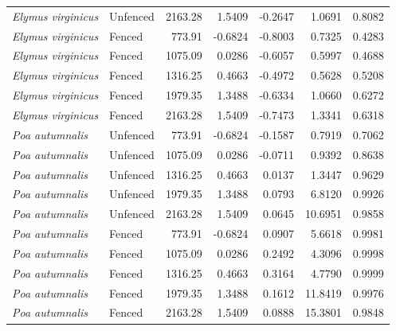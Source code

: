 \documentclass[12pt]{article}\usepackage[]{graphicx}\usepackage[dvipsnames]{xcolor}
\begin{document}
\begin{landscape}
\begin{table}[ht]
\begin{tabular}{llrrrrr}
\textit{Elymus virginicus} & Unfenced & 2163.28 & 1.5409   & -0.2647 & 1.0691 & 0.8082 \\
\textit{Elymus virginicus} & Fenced   & 773.91  & -0.6824  & -0.8003 & 0.7325 & 0.4283 \\
\textit{Elymus virginicus} & Fenced   & 1075.09 & 0.0286   & -0.6057 & 0.5997 & 0.4688 \\
\textit{Elymus virginicus} & Fenced   & 1316.25 & 0.4663   & -0.4972 & 0.5628 & 0.5208 \\
\textit{Elymus virginicus} & Fenced   & 1979.35 & 1.3488   & -0.6334 & 1.0660 & 0.6272 \\
\textit{Elymus virginicus} & Fenced   & 2163.28 & 1.5409   & -0.7473 & 1.3341 & 0.6318 \\
\textit{Poa autumnalis}    & Unfenced & 773.91  & -0.6824  & -0.1587 & 0.7919 & 0.7062 \\
\textit{Poa autumnalis}    & Unfenced & 1075.09 & 0.0286   & -0.0711 & 0.9392 & 0.8638 \\
\textit{Poa autumnalis}    & Unfenced & 1316.25 & 0.4663   & 0.0137  & 1.3447 & 0.9629 \\
\textit{Poa autumnalis}    & Unfenced & 1979.35 & 1.3488   & 0.0793  & 6.8120 & 0.9926 \\
\textit{Poa autumnalis}    & Unfenced & 2163.28 & 1.5409   & 0.0645  & 10.6951 & 0.9858 \\
\textit{Poa autumnalis}    & Fenced   & 773.91  & -0.6824  & 0.0907  & 5.6618 & 0.9981 \\
\textit{Poa autumnalis}    & Fenced   & 1075.09 & 0.0286   & 0.2492  & 4.3096 & 0.9998 \\
\textit{Poa autumnalis}    & Fenced   & 1316.25 & 0.4663   & 0.3164  & 4.7790 & 0.9999 \\
\textit{Poa autumnalis}    & Fenced   & 1979.35 & 1.3488   & 0.1612  & 11.8419 & 0.9976 \\
\textit{Poa autumnalis}    & Fenced   & 2163.28 & 1.5409   & 0.0888  & 15.3801 & 0.9848 \\
\hline
\end{tabular}
\end{table}
\end{landscape}
\end{document}
